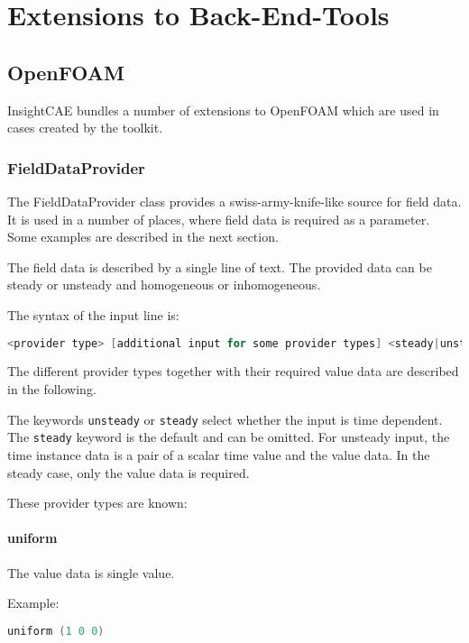 \section{Extensions to Back-End-Tools}

\subsection{OpenFOAM}

InsightCAE bundles a number of extensions to OpenFOAM which are used in cases created by the toolkit.

\subsubsection{FieldDataProvider}
\label{sec:FieldDataProvider}

The FieldDataProvider class provides a swiss-army-knife-like source for field data.
It is used in a number of places, where field data is required as a parameter.
Some examples are described in the next section.

The field data is described by a single line of text.
The provided data can be steady or unsteady and homogeneous or inhomogeneous.

The syntax of the input line is:
\begin{lstlisting}[language=c++]
<provider type> [additional input for some provider types] <steady|unsteady>   <time instance 1 data>  <time instance 2 data> ...
\end{lstlisting}

The different provider types together with their required value data are described in the following.

The keywords \texttt{unsteady} or \texttt{steady} select whether the input is time dependent.
The \texttt{steady} keyword is the default and can be omitted.
For unsteady input, the time instance data is a pair of a scalar time value and the value data.
In the steady case, only the value data is required.

These provider types are known:

\paragraph{uniform}
The value data is single value.

Example:
\begin{lstlisting}[language=c++]
uniform (1 0 0)
\end{lstlisting}

